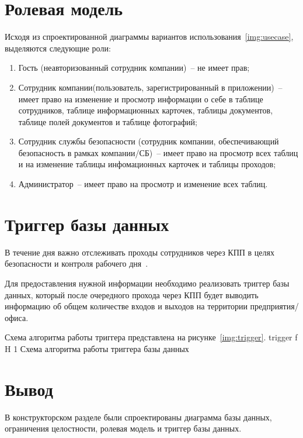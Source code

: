 \section{Ролевая модель}

Исходя из спроектированной диаграммы вариантов использования~\ref{img:usecase}, выделяются следующие роли:
\begin{enumerate}
	\item Гость (неавторизованный сотрудник компании)~-- не имеет прав;
	\item Сотрудник компании(пользователь, зарегистрированный в приложении)~-- имеет право на изменение и просмотр информации о себе в таблице сотрудников, таблице информационных карточек, таблицы документов, таблице полей документов и таблице фотографий;
	\item Сотрудник службы безопасности (сотрудник компании, обеспечивающий безопасность в рамках компании/СБ)~-- имеет право на просмотр всех таблиц и на изменение таблицы инфомационных карточек и таблицы проходов;
	\item Администратор~-- имеет право на просмотр и изменение всех таблиц.
\end{enumerate}

\section{Триггер базы данных}

В течение дня важно отслеживать проходы сотрудников через КПП в целях безопасности и контроля рабочего дня~\cite{introCPP}.

Для предоставления нужной информации необходимо реализовать триггер базы данных, который после очередного прохода через КПП будет выводить информацию об общем количестве входов и выходов на территории предприятия/офиса.

Схема алгоритма работы триггера представлена на рисунке~\ref{img:trigger}.
	{trigger}
	{f}
	{H}
	{1\textwidth}
	{Схема алгоритма работы триггера базы данных}

\section{Вывод}

В конструкторском разделе были спроектированы диаграмма базы данных, ограничения целостности, ролевая модель и триггер базы данных.